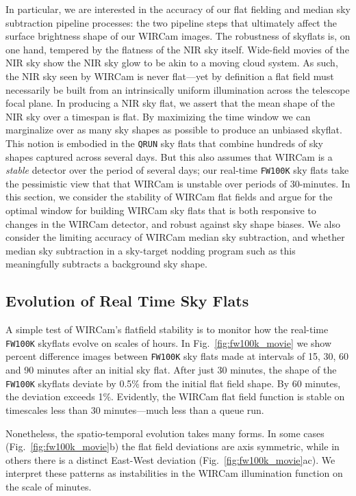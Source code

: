 \documentclass[iop]{emulateapj}
\newcommand{\mycomment}[1]{\textcolor{OliveGreen}{\textit{#1}}} %
\newcommand{\Fig}[1]{Fig.~\ref{fig:#1}}  %
\begin{document}
In particular, we are interested in the accuracy of our flat fielding and median sky subtraction pipeline processes: the two pipeline steps that ultimately affect the surface brightness shape of our WIRCam images.
The robustness of skyflats is, on one hand, tempered by the flatness of the NIR sky itself.
Wide-field movies of the NIR sky \citep{Adams:1996} show the NIR sky glow to be akin to a moving cloud system.
As such, the NIR sky seen by WIRCam is never flat---yet by definition a flat field must necessarily be built from an intrinsically uniform illumination across the telescope focal plane.
In producing a NIR sky flat, we assert that the mean shape of the NIR sky over a timespan is flat.
By maximizing the time window we can marginalize over as many sky shapes as possible to produce an unbiased skyflat.
This notion is embodied in the \texttt{QRUN} sky flats that combine hundreds of sky shapes captured across several days.
But this also assumes that WIRCam is a \emph{stable} detector over the period of several days; our real-time \texttt{FW100K} sky flats take the pessimistic view that that WIRCam is unstable over periods of 30-minutes.
In this section, we consider the stability of WIRCam flat fields and argue for the optimal window for building WIRCam sky flats that is both responsive to changes in the WIRCam detector, and robust against sky shape biases.
We also consider the limiting accuracy of WIRCam median sky subtraction, and whether median sky subtraction in a sky-target nodding program such as this meaningfully subtracts a background sky shape.

\subsection{Evolution of Real Time Sky Flats} %
\label{sec:flatevo}

A simple test of WIRCam's flatfield stability is to monitor how the real-time \texttt{FW100K} skyflats evolve on scales of hours.
In \Fig{fw100k_movie} we show percent difference images between \texttt{FW100K} sky flats made at intervals of 15, 30, 60 and 90 minutes after an initial sky flat.
After just 30 minutes, the shape of the \texttt{FW100K} skyflats deviate by 0.5\% from the initial flat field shape.
By 60 minutes, the deviation exceeds 1\%.
Evidently, the WIRCam flat field function is stable on timescales less than 30 minutes---much less than a queue run.

Nonetheless, the spatio-temporal evolution takes many forms.
In some cases (\Fig{fw100k_movie}b) the flat field deviations are axis symmetric, while in others there is a distinct East-West deviation (\Fig{fw100k_movie}ac).
We interpret these patterns as instabilities in the WIRCam illumination function on the scale of minutes.
\end{document}
